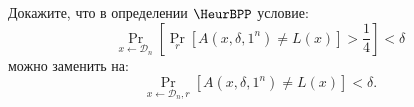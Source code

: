 Докажите, что в определении $\HeurBPP$ условие:
$$
    \Pr\limits_{x \gets \mathcal{D}_n}[\Pr\limits_{r}[A(x, \delta, 1^n) \neq L(x)] > \frac{1}{4}] <
    \delta
$$
можно заменить на:
$$
    \Pr\limits_{x \gets \mathcal{D}_n, r}[A(x, \delta, 1^n) \neq L(x)] < \delta.
$$
